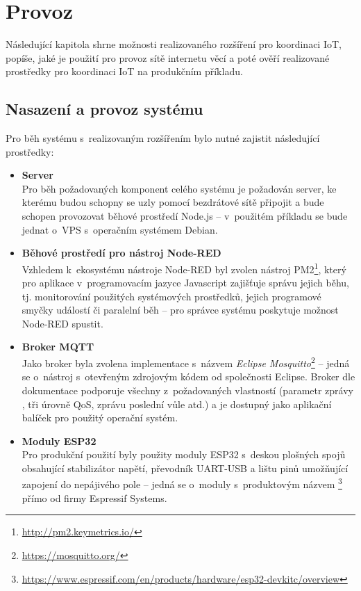 \chapter{Provoz}
\label{ch:provoz}

Následující kapitola shrne možnosti realizovaného rozšíření pro koordinaci IoT, popíše, jaké je použití pro provoz
sítě internetu věcí a poté ověří realizované prostředky pro koordinaci IoT na produkčním příkladu.

\section{Nasazení a provoz systému}\label{sec:nasazení-a-provoz-systému}
Pro běh systému s~realizovaným rozšířením bylo nutné zajistit následující prostředky:
\begin{itemize}
    \item \textbf{Server} \\
    Pro běh požadovaných komponent celého systému je požadován server, ke kterému budou schopny se uzly pomocí
    bezdrátové sítě připojit a bude schopen provozovat běhové prostředí Node.js -- v~použitém příkladu se bude jednat
    o~VPS s~operačním systémem Debian.

    \item \textbf{Běhové prostředí pro nástroj Node-RED} \\
    Vzhledem k~ekosystému nástroje Node-RED byl zvolen nástroj PM2\footnote{\url{http://pm2.keymetrics.io/}}, který pro
    aplikace v~programovacím jazyce Javascript zajišťuje správu jejich běhu, tj. monitorování použitých systémových
    prostředků, jejich programové smyčky událostí či paralelní běh -- pro správce systému poskytuje možnost Node-RED
    spustit.

    \item \textbf{Broker MQTT} \\
    Jako broker byla zvolena implementace s~názvem \emph{Eclipse Mosquitto}\footnote{\url{https://mosquitto.org/}} --
    jedná se o~nástroj s~otevřeným zdrojovým kódem od společnosti Eclipse.
    Broker dle dokumentace podporuje všechny z~požadovaných vlastností (parametr zprávy , tři úrovně QoS,
    zprávu poslední vůle atd.) a je dostupný jako aplikační balíček pro použitý operační systém.

    \item \textbf{Moduly ESP32} \\
    Pro produkční použití byly použity moduly ESP32 s~deskou plošných spojů obsahující stabilizátor napětí, převodník
    UART-USB a lištu pinů umožňující zapojení do nepájivého pole -- jedná se o~moduly s~produktovým názvem
    \footnote{\url{https://www.espressif.com/en/products/hardware/esp32-devkitc/overview}}
    přímo od firmy Espressif Systems.
\end{itemize}

